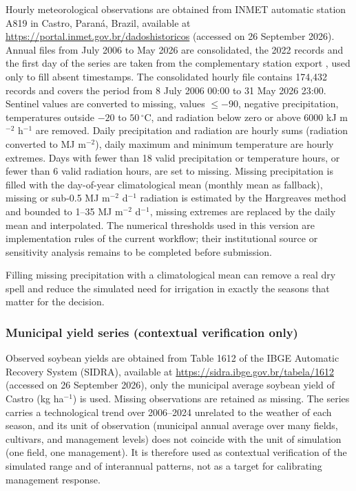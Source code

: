 \documentclass[times,final,authoryear]{elsarticle}
\begin{document}
Hourly meteorological observations are obtained from INMET automatic station A819 in Castro, Paraná, Brazil, available at
\url{https://portal.inmet.gov.br/dadoshistoricos} (accessed on 26 September 2026). Annual files from July 2006 to May 2026 are consolidated, the 2022 records and the first day of the series are taken from the complementary station export , used only to fill absent timestamps. The consolidated hourly file contains 174,432 records and covers the period from 8 July 2006 00:00 to 31 May 2026 23:00. Sentinel values are converted to missing, values $\leq -90$, negative precipitation, temperatures outside $-20$ to $50\,^{\circ}$C, and radiation below zero or above 6000 kJ m$^{-2}$ h$^{-1}$ are removed. Daily precipitation and radiation are hourly sums (radiation converted to MJ m$^{-2}$), daily maximum and minimum temperature are hourly extremes. Days with fewer than 18 valid precipitation or temperature hours, or fewer than 6 valid radiation hours, are set to missing. Missing precipitation is filled with the day-of-year climatological mean (monthly mean as fallback), missing or sub-0.5 MJ m$^{-2}$ d$^{-1}$ radiation is estimated by the Hargreaves method and bounded to 1--35 MJ m$^{-2}$ d$^{-1}$, missing extremes are replaced by the daily mean and interpolated. The numerical thresholds used in this version are implementation rules of the current workflow; their institutional source or sensitivity analysis remains to be completed before submission.

Filling missing precipitation with a climatological mean can remove a real dry spell and reduce the simulated need for irrigation in exactly the seasons that matter for the decision. 

\subsubsection{Municipal yield series (contextual verification only)}
\label{subsidra}

Observed soybean yields are obtained from Table 1612 of the IBGE Automatic Recovery System (SIDRA), available at
\url{https://sidra.ibge.gov.br/tabela/1612} (accessed on 26 September 2026), only the municipal average soybean yield of Castro (kg ha$^{-1}$) is used. Missing observations are retained as missing. The series carries a technological trend over 2006--2024 unrelated to the weather of each season, and its unit of observation (municipal annual average over many fields, cultivars, and management levels) does not coincide with the unit of simulation (one field, one management). It is therefore used as contextual verification of the simulated range and of interannual patterns, not as a target for calibrating management response.
\end{document}
